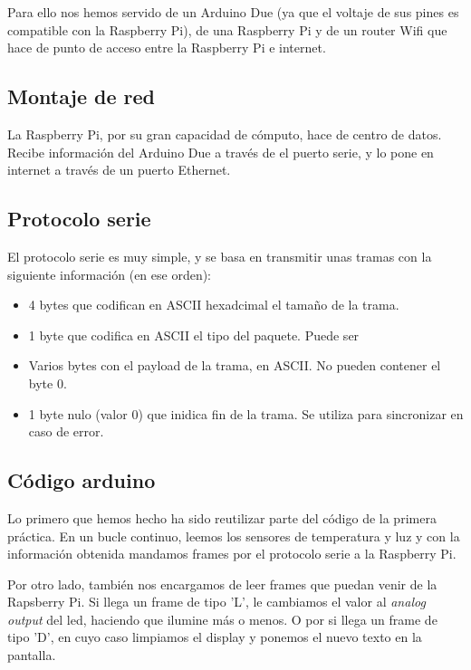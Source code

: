 \documentclass[]{article}
\begin{document}
Para ello nos hemos servido de un Arduino Due (ya que el voltaje de sus pines es compatible con la Raspberry Pi), de una Raspberry Pi y de un router Wifi que hace de punto de acceso entre la Raspberry Pi e internet.

\subsection{Montaje de red}

La Raspberry Pi, por su gran capacidad de cómputo, hace de centro de datos. Recibe información del Arduino Due a través de el puerto serie, y lo pone en internet a través de un puerto Ethernet. 

\subsection{Protocolo serie}

El protocolo serie es muy simple, y se basa en transmitir unas tramas con la siguiente información (en ese orden):

\begin{itemize}
	\item 4 bytes que codifican en ASCII hexadcimal el tamaño de la trama.
	\item 1 byte que codifica en ASCII el tipo del paquete. Puede ser %
	\item Varios bytes con el payload de la trama, en ASCII. No pueden contener el byte 0.
	\item 1 byte nulo (valor 0) que inidica fin de la trama. Se utiliza para sincronizar en caso de error.
\end{itemize}

\subsection{Código arduino}

Lo primero que hemos hecho ha sido reutilizar parte del código de la primera práctica. En un bucle continuo, leemos los sensores de temperatura y luz y con la información obtenida mandamos frames por el protocolo serie a la Raspberry Pi.

\hfill

Por otro lado, también nos encargamos de leer frames que puedan venir de la Rapsberry Pi. Si llega un frame de tipo 'L', le cambiamos el valor al \textit{analog output} del led, haciendo que ilumine más o menos. O por si llega un frame de tipo 'D', en cuyo caso limpiamos el display y ponemos el nuevo texto en la pantalla.
\end{document}
